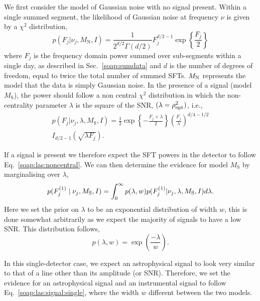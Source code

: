 We first consider the model of Gaussian noise with no signal present. Within
a single summed segment, the likelihood of Gaussian noise at
frequency $\nu$ is given by a $\chi^2$ distribution,
%
\begin{equation}
\label{soap:las:central}
p(F_j|\nu_j,M_{\text{N}},I) = \frac{1}{2^{d/2}\Gamma(d/2)}F_j^{d/2 - 1}\exp{\left\{
\frac{F_j}{2}\right\}}
\end{equation}
%
where $F_j$ is the frequency domain power summed over sub-segments within a single day, as described in Sec.~\ref{soap:sumdata} and  $d$ is the number of degrees of freedom,  equal to twice the total number of summed SFTs.  $M_{\rm{N}}$ represents the model that the data is simply Gaussian noise. In the presence of a signal (model $M_{\text{S}}$), the power should follow a non central $ \chi^2 $ distribution in which the non-centrality parameter $\lambda$ is the square of the \gls{SNR}, $(\lambda = \rho_{\rm{opt}}^2 )$, i.e.,
%
\begin{equation}
\label{soap:las:noncentral}
\begin{split}
p(F_j|\nu_j,\lambda,M_{\text{S}},I) = \frac{1}{2} \exp{\left\{ -\frac{F_j+\lambda}{2}\right\}} \left( \frac{F_j}{\lambda} \right)^{d/4 - 1/2} \\
I_{d/2 -1}\left( \sqrt{\lambda F_j}\right).
\end{split}
\end{equation}
%

If a signal is present we therefore expect the \gls{SFT} powers in the detector to follow Eq.~\ref{soap:las:noncentral}.  We can then determine the evidence for model $M_{\text{S}}$ by marginalising over $\lambda$,
%
\begin{equation}
\label{soap:las:signal:single}
\begin{split}
p(F^{(1)}_{j} \mid \nu_j,M_{\rm{S}},I) = \int_0^{\infty}  p(\lambda,w) 
p(F^{(1)}_{j}|\nu_j,\lambda,M_{\text{S}},I) d\lambda.
\end{split}
\end{equation}
%
Here we set the prior on $\lambda$ to be an exponential distribution of width $w$, this is done somewhat arbitrarily as we expect the majority of signals to have a low \gls{SNR}. This distribution follows,
\begin{equation}
\label{soap:las:prior}
p(\lambda,w) = \exp\left( \frac{-\lambda}{w}\right).
\end{equation}

In this single-detector case, we expect an astrophysical signal to look very similar to that of a line other than its amplitude (or SNR). Therefore, we set the evidence for an astrophysical signal and an instrumental signal to follow Eq.~\ref{soap:las:signal:single}, where the width $w$ different between the two models.


